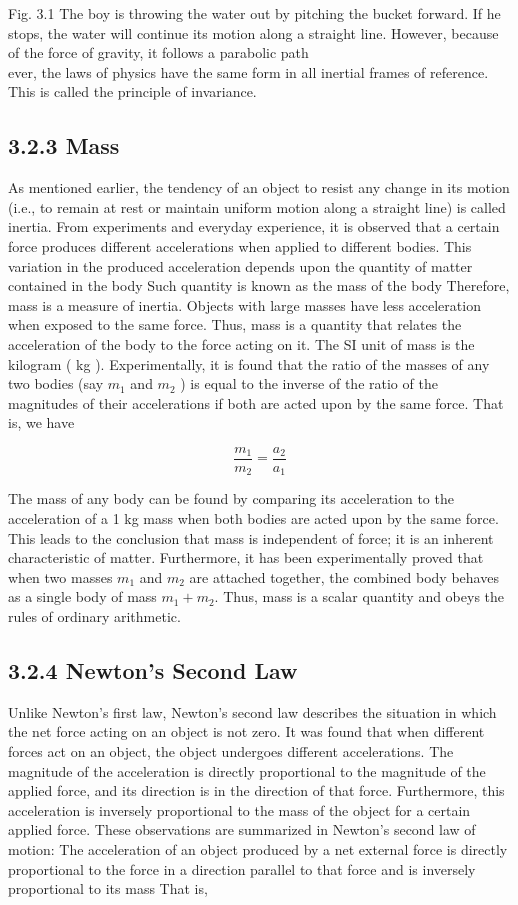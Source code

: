 \documentclass[10pt]{article}
\begin{document}
Fig. 3.1 The boy is throwing the water out by pitching the bucket forward. If he stops, the water will continue its motion along a straight line. However, because of the force of gravity, it follows a parabolic path\\
ever, the laws of physics have the same form in all inertial frames of reference. This is called the principle of invariance.

\subsection*{3.2.3 Mass}
As mentioned earlier, the tendency of an object to resist any change in its motion (i.e., to remain at rest or maintain uniform motion along a straight line) is called inertia. From experiments and everyday experience, it is observed that a certain force produces different accelerations when applied to different bodies. This variation in the produced acceleration depends upon the quantity of matter contained in the body Such quantity is known as the mass of the body Therefore, mass is a measure of inertia. Objects with large masses have less acceleration when exposed to the same force. Thus, mass is a quantity that relates the acceleration of the body to the force acting on it. The SI unit of mass is the kilogram ( kg ). Experimentally, it is found that the ratio of the masses of any two bodies (say $m_{1}$ and $m_{2}$ ) is equal to the inverse of the ratio of the magnitudes of their accelerations if both are acted upon by the same force. That is, we have

$$
\frac{m_{1}}{m_{2}}=\frac{a_{2}}{a_{1}}
$$

The mass of any body can be found by comparing its acceleration to the acceleration of a 1 kg mass when both bodies are acted upon by the same force. This leads to the conclusion that mass is independent of force; it is an inherent characteristic of matter. Furthermore, it has been experimentally proved that when two masses $m_{1}$ and $m_{2}$ are attached together, the combined body behaves as a single body of mass $m_{1}+m_{2}$. Thus, mass is a scalar quantity and obeys the rules of ordinary arithmetic.

\subsection*{3.2.4 Newton's Second Law}
Unlike Newton's first law, Newton's second law describes the situation in which the net force acting on an object is not zero. It was found that when different forces act on an object, the object undergoes different accelerations. The magnitude of the acceleration is directly proportional to the magnitude of the applied force, and its direction is in the direction of that force. Furthermore, this acceleration is inversely proportional to the mass of the object for a certain applied force. These observations are summarized in Newton's second law of motion: The acceleration of an object produced by a net external force is directly proportional to the force in a direction parallel to that force and is inversely proportional to its mass That is,
\end{document}

